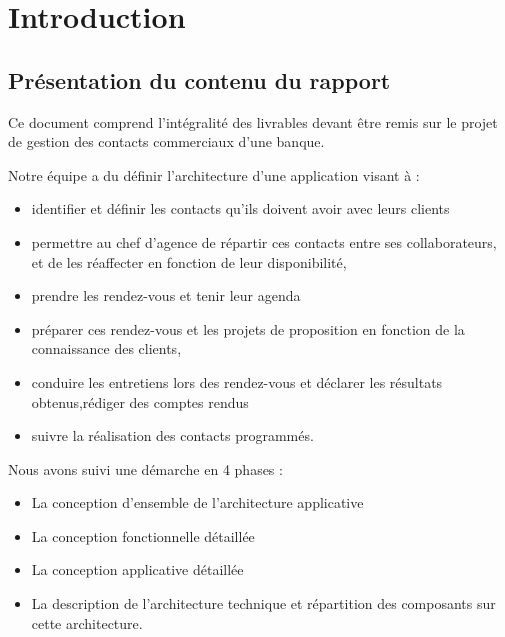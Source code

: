 





\listoftodos
\newpage
{}
\tableofcontents
{}
\listoffigures
{}
\listoftables
\newpage
{}
\chapter*{Introduction}
\section*{Présentation du contenu du rapport}
Ce document comprend l'intégralité des livrables devant être remis sur le projet de gestion des contacts commerciaux d'une banque. 

Notre équipe a du définir l'architecture d'une application visant à : \\
\begin{itemize}
\item identifier et définir les contacts qu’ils doivent avoir avec leurs clients
\item permettre au chef d’agence de répartir ces contacts entre ses collaborateurs, et de les réaffecter en fonction de leur disponibilité,
\item prendre les rendez-vous et tenir leur agenda
\item préparer ces rendez-vous et les projets de proposition en fonction de la connaissance des
clients,
\item conduire les entretiens lors des rendez-vous et déclarer les résultats obtenus,rédiger des comptes rendus
\item suivre la réalisation des contacts programmés.\\

\end{itemize}


Nous avons suivi une démarche en 4 phases : 
\begin{itemize}
\item La conception d’ensemble de l’architecture applicative
\item La conception fonctionnelle détaillée
\item La conception applicative détaillée
\item La description de l’architecture technique et répartition des composants sur cette
architecture.\\
\end{itemize}

